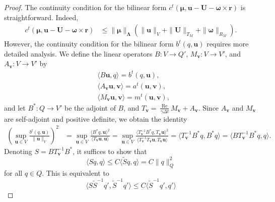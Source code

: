 \documentclass{article}
\newcommand{\bU}{{\mathbf{U}}}
\newcommand{\bu}{{\mathbf{u}}}
\newcommand{\bv}{{\mathbf{v}}}
\newcommand{\bomega}{{\boldsymbol{\omega}}}
\newcommand{\Reynolds}{{\operatorname{Re}}}
\begin{document}
\begin{proof}
    The continuity condition for the bilinear form $c^t(\boldsymbol{\mu},\bu - \bU - \bomega\times\mathbf{r})$ is  straightforward. Indeed,
\begin{equation}
    \begin{aligned}
        {c}^t({\boldsymbol{\mu}},\bu - {\bU} - {\bomega}\times\mathbf{r})
        &\leq \|{\boldsymbol{\mu}}\|_{\boldsymbol{\Lambda}} \left( \|\bu\|_V + \|\bU\|_{T_M} + \|\bomega\|_{R_M} \right).
    \end{aligned}
\end{equation}
However, the continuity condition for the bilinear form $b^t(q,\bu)$ requires more detailed analysis. 
We define the linear operators $B: V \to Q'$, $M_\bv: V \to V'$, and $A_\bv: V \to V'$ by
\begin{equation}
    \begin{aligned}
        &\langle B\bu, q \rangle = b^t(q, \bu), \\
        &\langle A_\bv\bu, \bv \rangle = a^t(\bu, \bv), \\
        &\langle M_\bv\bu, \bv \rangle = m^t(\bu, \bv),
    \end{aligned}
\end{equation}
and let $B^*: Q \to V'$ be the adjoint of $B$, and $T_\bv = \frac{\Reynolds}{\gamma\Delta t} M_\bv + A_\bv$. Since $A_\bv$ and $M_\bv$ are self-adjoint and positive definite, we obtain the identity
\begin{equation}
    \begin{aligned}
    \left( \sup_{\bu \in V} \frac{b^t(q, \bu)}{\|\bu\|_V} \right)^2 
    &= \sup_{\bu \in V} \frac{\langle B^* q, \bu \rangle^2}{\langle T_\bv \bu, \bu \rangle} 
     = \sup_{\bu \in V} \frac{\langle T_\bv^{-1} B^* q, T_\bv \bu \rangle^2}{\langle T_\bv^{-1} T_\bv \bu, T_\bv \bu \rangle} 
     = \langle T_\bv^{-1} B^* q, B^* q \rangle 
     = \langle B T_\bv^{-1} B^* q, q \rangle.
    \end{aligned}
\end{equation}
Denoting $S = B T_\bv^{-1} B^*$, it suffices to show that
\begin{equation}
    \langle S q, q \rangle \leq C \langle \tilde{S} q, q \rangle = C \|q\|_Q^2
\end{equation}
for all $q \in Q$. This is equivalent to
\begin{equation}
    \langle S \tilde{S}^{-1} q', \tilde{S}^{-1} q' \rangle \leq C \langle \tilde{S}^{-1} q', q' \rangle
\end{equation}

\end{proof}
\end{document}
